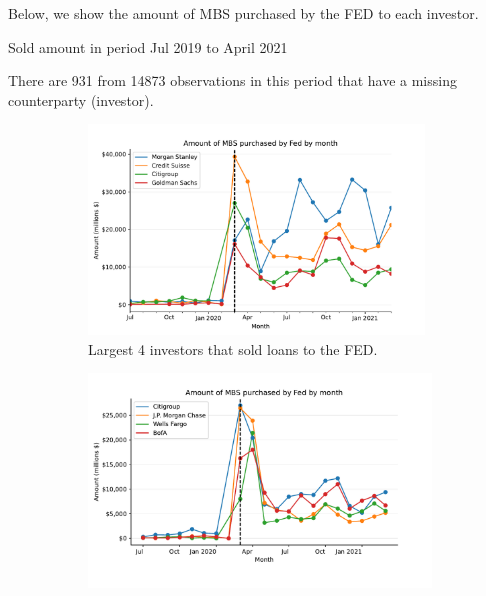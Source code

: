 \documentclass[11pt,a4paper]{article}
\begin{document}
\pagebreak

Below, we show the amount of MBS purchased by the FED to each investor.
\begin{table}[h]
    \centering
    
    \caption{Sold amount in period Jul 2019 to April 2021}\label{tab:descriptive}
\end{table}

There are 931 from  14873 observations in this period that have a missing counterparty (investor).

\pagebreak
\begin{figure}[h]
    \centering
    \begin{subfigure}[b]{0.7\textwidth}
        \includegraphics[width=0.98\textwidth]{../results/figures/fed_mbs_amount_by_month_example_larg4.pdf}
        \caption{Largest 4 investors that sold loans to the FED.}\label{fig:larg4}
       \end{subfigure}
       \begin{subfigure}[b]{0.7\textwidth}
        \includegraphics[width=0.999\textwidth]{../results/figures/fed_mbs_amount_by_month_example_retail.pdf}

\end{subfigure}
\end{figure}
\end{document}
